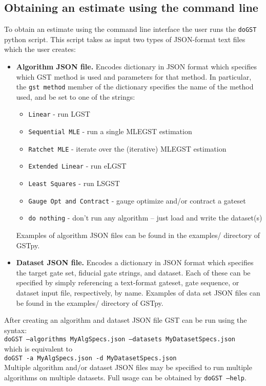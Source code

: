 \documentclass{article}[11pt]
\begin{document}
\subsection{Obtaining an estimate using the command line\label{secEstimateUsingCmdLine}}
To obtain an estimate using the command line interface the user runs the \texttt{doGST} python script.  This script takes as input two types of JSON-format text files which the user creates:
\begin{itemize}
\item \textbf{Algorithm JSON file.} Encodes dictionary in JSON format which specifies which GST method is used and parameters for that method.  In particular, the \texttt{gst method} member of the dictionary specifies the name of the method used, and be set to one of the strings:
  \begin{itemize}
    \item \texttt{Linear} - run LGST
    \item \texttt{Sequential MLE} - run a single MLEGST estimation
    \item \texttt{Ratchet MLE} - iterate over the (iterative) MLEGST estimation
    \item \texttt{Extended Linear} - run eLGST
    \item \texttt{Least Squares} - run LSGST
    \item \texttt{Gauge Opt and Contract} - gauge optimize and/or contract a gateset
    \item \texttt{do nothing} - don't run any algorithm -- just load and write the dataset(s)
  \end{itemize}
  Examples of algorithm JSON files can be found in the examples/ directory of GSTpy.

\item \textbf{Dataset JSON file.} Encodes a dictionary in JSON format which specifies the target gate set, fiducial gate strings, and dataset.  Each of these can be specified by simply referencing a text-format gateset, gate sequence, or dataset input file, respectively, by name.  Examples of data set JSON files can be found in the examples/ directory of GSTpy.
\end{itemize}
After creating an algorithm and dataset JSON file GST can be run using the syntax:\\
\texttt{doGST --algorithms MyAlgSpecs.json --datasets MyDatasetSpecs.json}\\
which is equivalent to \\
\texttt{doGST -a MyAlgSpecs.json -d MyDatasetSpecs.json}\\
Multiple algorithm and/or dataset JSON files may be specified to run multiple algorithms on multiple datasets.  Full usage can be obtained by \texttt{doGST --help}.
\end{document}
